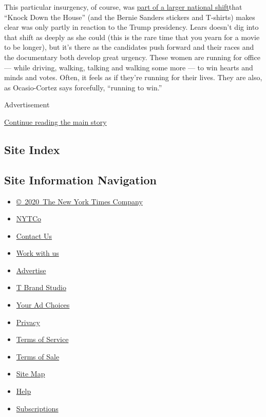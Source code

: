 This particular insurgency, of course, was
\href{https://www.nytimes.com/2017/11/08/us/politics/democrats-women-minorities.html}{part
of a larger national shift}that ``Knock Down the House'' (and the Bernie
Sanders stickers and T-shirts) makes clear was only partly in reaction
to the Trump presidency. Lears doesn't dig into that shift as deeply as
she could (this is the rare time that you yearn for a movie to be
longer), but it's there as the candidates push forward and their races
and the documentary both develop great urgency. These women are running
for office --- while driving, walking, talking and walking some more ---
to win hearts and minds and votes. Often, it feels as if they're running
for their lives. They are also, as Ocasio-Cortez says forcefully,
``running to win.''

Advertisement

\protect\hyperlink{after-bottom}{Continue reading the main story}

\hypertarget{site-index}{%
\subsection{Site Index}\label{site-index}}

\hypertarget{site-information-navigation}{%
\subsection{Site Information
Navigation}\label{site-information-navigation}}

\begin{itemize}
\tightlist
\item
  \href{https://help.nytimes.com/hc/en-us/articles/115014792127-Copyright-notice}{©~2020~The
  New York Times Company}
\end{itemize}

\begin{itemize}
\tightlist
\item
  \href{https://www.nytco.com/}{NYTCo}
\item
  \href{https://help.nytimes.com/hc/en-us/articles/115015385887-Contact-Us}{Contact
  Us}
\item
  \href{https://www.nytco.com/careers/}{Work with us}
\item
  \href{https://nytmediakit.com/}{Advertise}
\item
  \href{http://www.tbrandstudio.com/}{T Brand Studio}
\item
  \href{https://www.nytimes.com/privacy/cookie-policy\#how-do-i-manage-trackers}{Your
  Ad Choices}
\item
  \href{https://www.nytimes.com/privacy}{Privacy}
\item
  \href{https://help.nytimes.com/hc/en-us/articles/115014893428-Terms-of-service}{Terms
  of Service}
\item
  \href{https://help.nytimes.com/hc/en-us/articles/115014893968-Terms-of-sale}{Terms
  of Sale}
\item
  \href{https://spiderbites.nytimes.com}{Site Map}
\item
  \href{https://help.nytimes.com/hc/en-us}{Help}
\item
  \href{https://www.nytimes.com/subscription?campaignId=37WXW}{Subscriptions}
\end{itemize}
